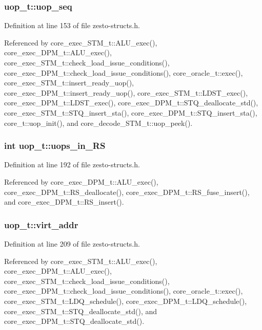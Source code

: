 \subsubsection[{uop\_\-seq}]{ {\bf uop\_\-t::uop\_\-seq}}\label{structuop__t_a7b9e443607a13d90b1b51db2a921257}




Definition at line 153 of file zesto-structs.h.

Referenced by core\_\-exec\_\-STM\_\-t::ALU\_\-exec(), core\_\-exec\_\-DPM\_\-t::ALU\_\-exec(), core\_\-exec\_\-STM\_\-t::check\_\-load\_\-issue\_\-conditions(), core\_\-exec\_\-DPM\_\-t::check\_\-load\_\-issue\_\-conditions(), core\_\-oracle\_\-t::exec(), core\_\-exec\_\-STM\_\-t::insert\_\-ready\_\-uop(), core\_\-exec\_\-DPM\_\-t::insert\_\-ready\_\-uop(), core\_\-exec\_\-STM\_\-t::LDST\_\-exec(), core\_\-exec\_\-DPM\_\-t::LDST\_\-exec(), core\_\-exec\_\-DPM\_\-t::STQ\_\-deallocate\_\-std(), core\_\-exec\_\-STM\_\-t::STQ\_\-insert\_\-sta(), core\_\-exec\_\-DPM\_\-t::STQ\_\-insert\_\-sta(), core\_\-t::uop\_\-init(), and core\_\-decode\_\-STM\_\-t::uop\_\-peek().
\subsubsection[{uops\_\-in\_\-RS}]{\setlength{\rightskip}{0pt plus 5cm}int {\bf uop\_\-t::uops\_\-in\_\-RS}}\label{structuop__t_a1d3be5c5165d80adc09e68c841a79d3}




Definition at line 192 of file zesto-structs.h.

Referenced by core\_\-exec\_\-DPM\_\-t::ALU\_\-exec(), core\_\-exec\_\-DPM\_\-t::RS\_\-deallocate(), core\_\-exec\_\-DPM\_\-t::RS\_\-fuse\_\-insert(), and core\_\-exec\_\-DPM\_\-t::RS\_\-insert().
\subsubsection[{virt\_\-addr}]{ {\bf uop\_\-t::virt\_\-addr}}\label{structuop__t_d7e89a7b0583599bf140c251ce1731f5}




Definition at line 209 of file zesto-structs.h.

Referenced by core\_\-exec\_\-STM\_\-t::ALU\_\-exec(), core\_\-exec\_\-DPM\_\-t::ALU\_\-exec(), core\_\-exec\_\-STM\_\-t::check\_\-load\_\-issue\_\-conditions(), core\_\-exec\_\-DPM\_\-t::check\_\-load\_\-issue\_\-conditions(), core\_\-oracle\_\-t::exec(), core\_\-exec\_\-STM\_\-t::LDQ\_\-schedule(), core\_\-exec\_\-DPM\_\-t::LDQ\_\-schedule(), core\_\-exec\_\-STM\_\-t::STQ\_\-deallocate\_\-std(), and core\_\-exec\_\-DPM\_\-t::STQ\_\-deallocate\_\-std().
